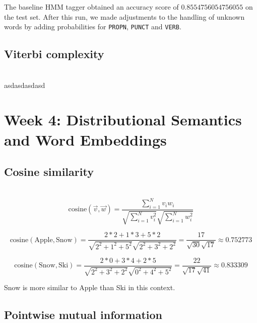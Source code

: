 \documentclass[a4paper, 11pt]{article}
\begin{document}
The baseline HMM tagger obtained an accuracy score of $0.8554756054756055$ on the test set. After this run, we made adjustments to the handling of unknown words by adding probabilities for \texttt{PROPN}, \texttt{PUNCT} and \texttt{VERB}.

\subsection{Viterbi complexity}

\noindent{}\\

asdasdasdasd

\section{Week 4: Distributional Semantics and Word Embeddings}

\subsection{Cosine similarity}

\noindent{}\\

$$\text{cosine}(\vec{v},\vec{w}) = \frac{\sum_{i=1}^{N} v_i w_i}{\sqrt{\sum_{i=1}^{N} v_{i}^2} \sqrt{\sum_{i=1}^{N} w_{i}^2}}$$

$$\text{cosine}(\text{Apple}, \text{Snow}) = \frac{2*2 + 1*3 + 5*2}{\sqrt{2^2 + 1^2 + 5^2} \sqrt{2^2 + 3^2 + 2^2}} = \frac{17}{\sqrt{30} \sqrt{17}} \approx 0.752773$$

$$\text{cosine}(\text{Snow}, \text{Ski}) = \frac{2*0 + 3*4 + 2*5}{\sqrt{2^2 + 3^2 + 2^2} \sqrt{0^2 + 4^2 + 5^2}} = \frac{22}{\sqrt{17} \sqrt{41}} \approx 0.833309$$

Snow is more similar to Apple than Ski in this context.

\subsection{Pointwise mutual information}

\noindent{}\\
\end{document}
